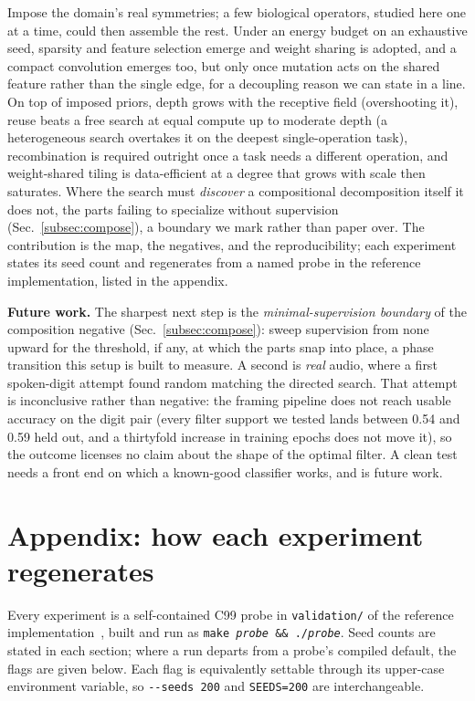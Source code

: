 \documentclass[11pt]{article}
\begin{document}
Impose the domain's real symmetries; a few biological operators, studied here one at a time, could then
assemble the rest. Under an energy
budget on an exhaustive seed, sparsity and feature selection emerge and weight sharing is adopted, and a
compact convolution emerges too, but only once mutation acts on the shared feature rather than the single
edge, for a decoupling reason we can state in a line. On top of imposed priors,
depth grows with the receptive field (overshooting it), reuse beats a free search at equal compute up to
moderate depth (a heterogeneous search overtakes it on the deepest single-operation task), recombination is
required outright once a task needs a different operation, and weight-shared tiling is
data-efficient at a degree that grows with scale then saturates. Where the search must \emph{discover} a
compositional decomposition itself it does not, the parts failing to specialize without supervision
(Sec.~\ref{subsec:compose}), a boundary we mark rather than paper over. The contribution is the map, the negatives, and
the reproducibility; each experiment states its seed count and regenerates from a named probe in the
reference implementation, listed in the appendix.

\textbf{Future work.} The sharpest next step is the \emph{minimal-supervision boundary} of the composition
negative (Sec.~\ref{subsec:compose}): sweep supervision from none upward for the threshold, if any, at which
the parts snap into place, a phase transition this setup is built to measure. A second is \emph{real} audio,
where a first spoken-digit attempt found random matching the directed search. That attempt is inconclusive
rather than negative: the framing pipeline does not reach usable accuracy on the digit pair (every filter
support we tested lands between 0.54 and 0.59 held out, and a thirtyfold increase in training epochs does
not move it), so the outcome licenses no claim about the shape of the optimal filter. A clean test needs a
front end on which a known-good classifier works, and is future work.

\section*{Appendix: how each experiment regenerates}

Every experiment is a self-contained C99 probe in \texttt{validation/} of the reference
implementation~\cite{repo}, built and run as \texttt{make \emph{probe} \&\& ./\emph{probe}}. Seed counts
are stated in each section; where a run departs from a probe's compiled default, the flags are given
below. Each flag is equivalently settable through its upper-case environment variable, so
\texttt{-{}-seeds 200} and \texttt{SEEDS=200} are interchangeable.
\end{document}
